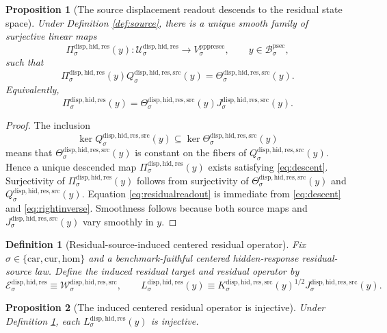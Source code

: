 \documentclass[11pt]{article}
\newcommand{\Car}{\mathrm{car}}
\newcommand{\Cur}{\mathrm{cur}}
\newcommand{\Hom}{\mathrm{hom}}
\newcommand{\ProtoSectionBody}[1]{\mathcal B_{#1}^{\mathrm{psec}}}
\newcommand{\PrePreProtoSectionVertical}[1]{V_{#1}^{\mathrm{pppresec}}}
\newcommand{\ResidualState}[1]{\mathcal U_{#1}^{\mathrm{disp,hid,res}}}
\newcommand{\ResidualTarget}[1]{\mathcal E_{#1}^{\mathrm{disp,hid,res}}}
\newcommand{\ResidualReadout}[1]{\Pi_{#1}^{\mathrm{disp,hid,res}}}
\newcommand{\ResidualOperator}[1]{L_{#1}^{\mathrm{disp,hid,res}}}
\newcommand{\ResidualSourceCarrier}[1]{\mathcal W_{#1}^{\mathrm{disp,hid,res,src}}}
\newcommand{\ResidualSourceProjection}[1]{Q_{#1}^{\mathrm{disp,hid,res,src}}}
\newcommand{\ResidualSourceReadout}[1]{\Theta_{#1}^{\mathrm{disp,hid,res,src}}}
\newcommand{\ResidualSourceOperator}[1]{K_{#1}^{\mathrm{disp,hid,res,src}}}
\newcommand{\ResidualSourceLift}[1]{J_{#1}^{\mathrm{disp,hid,res,src}}}
\newtheorem{definition}{Definition}
\newtheorem{proposition}{Proposition}
\begin{document}
\begin{proposition}[The source displacement readout descends to the residual state space]
\label{prop:descent}
Under Definition \ref{def:source}, there is a unique smooth family of surjective linear maps
\[
\ResidualReadout{\sigma}(y):
\ResidualState{\sigma}\to\PrePreProtoSectionVertical{\sigma},
\qquad
y\in\ProtoSectionBody{\sigma},
\]
such that
\begin{equation}
\ResidualReadout{\sigma}(y)\ResidualSourceProjection{\sigma}(y)
=
\ResidualSourceReadout{\sigma}(y).
\label{eq:descent}
\end{equation}
Equivalently,
\begin{equation}
\ResidualReadout{\sigma}(y)
=
\ResidualSourceReadout{\sigma}(y)\ResidualSourceLift{\sigma}(y).
\label{eq:residualreadout}
\end{equation}
\end{proposition}

\begin{proof}
The inclusion
\[
\ker \ResidualSourceProjection{\sigma}(y)
\subseteq
\ker \ResidualSourceReadout{\sigma}(y)
\]
means that \(\ResidualSourceReadout{\sigma}(y)\) is constant on the fibers of \(\ResidualSourceProjection{\sigma}(y)\). Hence a unique descended map \(\ResidualReadout{\sigma}(y)\) exists satisfying \eqref{eq:descent}. Surjectivity of \(\ResidualReadout{\sigma}(y)\) follows from surjectivity of \(\ResidualSourceReadout{\sigma}(y)\) and \(\ResidualSourceProjection{\sigma}(y)\). Equation \eqref{eq:residualreadout} is immediate from \eqref{eq:descent} and \eqref{eq:rightinverse}. Smoothness follows because both source maps and \(\ResidualSourceLift{\sigma}(y)\) vary smoothly in \(y\).
\end{proof}

\begin{definition}[Residual-source-induced centered residual operator]
\label{def:induced}
Fix \(\sigma\in\{\Car,\Cur,\Hom\}\) and a benchmark-faithful centered hidden-response residual-source law. Define the induced residual target and residual operator by
\[
\ResidualTarget{\sigma}
\equiv
\ResidualSourceCarrier{\sigma},
\qquad
\ResidualOperator{\sigma}(y)
\equiv
\ResidualSourceOperator{\sigma}(y)^{1/2}
\ResidualSourceLift{\sigma}(y).
\]
\end{definition}

\begin{proposition}[The induced centered residual operator is injective]
\label{prop:injective}
Under Definition \ref{def:induced}, each \(\ResidualOperator{\sigma}(y)\) is injective.
\end{proposition}
\end{document}
